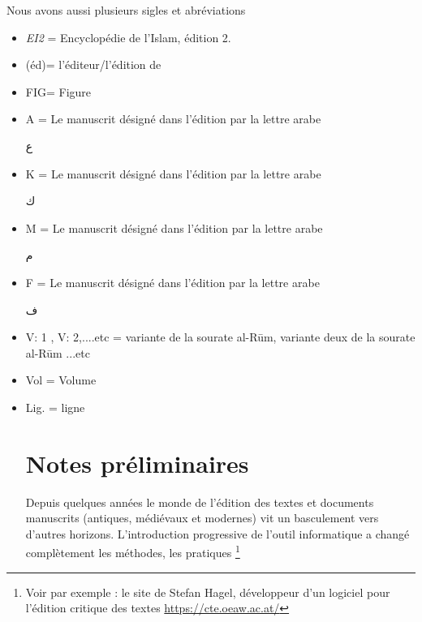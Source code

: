 \documentclass[a4paper,12pt]{report}
\begin{document}
Nous avons aussi  plusieurs sigles et abréviations

\begin{itemize}
   
    \item \textit{EI2} = Encyclopédie de l'Islam, édition 2.  
    \item (éd)= l'éditeur/l'édition de 
    \item FIG= Figure
     \item   A = Le manuscrit désigné  dans l'édition par la lettre arabe 
\begin{Arabic}
 \Large ع 
\end{Arabic}
    \item K = Le manuscrit désigné dans l'édition par la lettre arabe 
    \begin{Arabic}
 \Large ك 
\end{Arabic}
    \item  M = Le manuscrit désigné dans l'édition par la lettre arabe  \begin{Arabic}
 \Large م
\end{Arabic}
    \item  F  = Le manuscrit désigné dans l'édition par la lettre arabe  \begin{Arabic}
 \Large ف
\end{Arabic}
    \item V: 1 , V: 2,....etc = variante  de la sourate al-Rūm, variante deux de la sourate al-Rūm ...etc
   
    \item Vol = Volume 
    \item Lig. = ligne 














\newpage
{}
\setcounter{page}{4}

\chapter*{Notes préliminaires}

\thispagestyle{empty}
Depuis quelques années le monde de l'édition des textes et documents manuscrits (antiques, médiévaux et modernes) vit un basculement vers d'autres horizons. L'introduction progressive de l'outil informatique a changé complètement les méthodes, les pratiques \footnote { Voir par exemple : le site de Stefan Hagel, développeur d'un logiciel pour l'édition critique des textes   \url{ https://cte.oeaw.ac.at/} 

}
\end{itemize}
\end{document}
